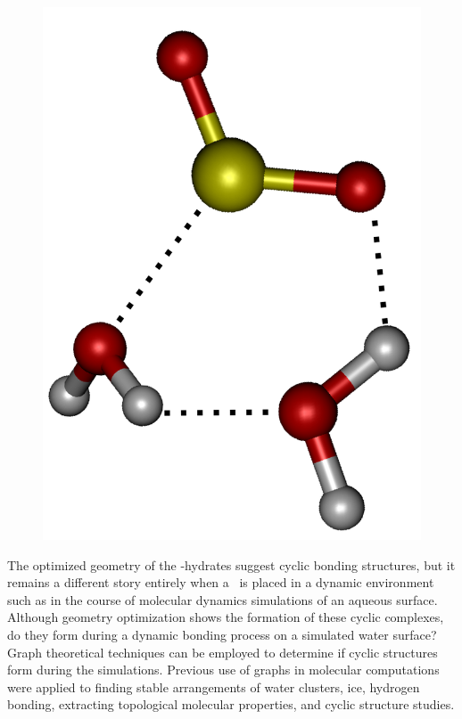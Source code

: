 \begin{figure}[h!]
	\begin{center}
		\includegraphics[scale=1.0]{images/cycles/double-cycle-type2-small.png}
		\caption{}
		\label{fig:cyclic-example}
	\end{center}
\end{figure}

The optimized geometry of the \suldiox-hydrates suggest cyclic bonding structures, but it remains a different story entirely when a \suldiox~is placed in a dynamic environment such as in the course of molecular dynamics simulations of an aqueous surface. Although geometry optimization shows the formation of these cyclic complexes, do they form during a dynamic bonding process on a simulated water surface? Graph theoretical techniques can be employed to determine if cyclic structures form during the simulations. Previous use of graphs in molecular computations were applied to finding stable arrangements of water clusters, ice, hydrogen bonding, extracting topological molecular properties, and cyclic structure studies.\cite{Anick2002, Huber2007, Radhakrishnan1991, Shi2005, Garcia2004, McDonald1998}

